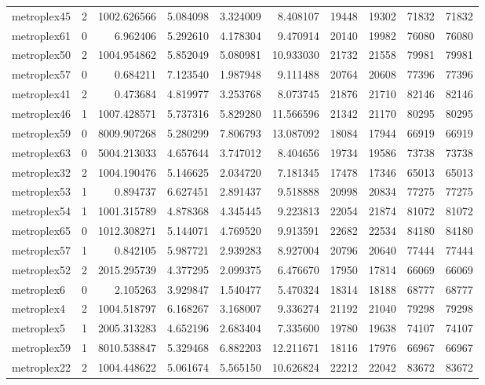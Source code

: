 \begin{longtable}{|l|r|r|r|r|r|r|r|r|r|}
metroplex45 & 2 & 1002.626566 & 5.084098 & 3.324009 & 8.408107 & 19448 & 19302 & 71832 & 71832 \\
metroplex61 & 0 & 6.962406 & 5.292610 & 4.178304 & 9.470914 & 20140 & 19982 & 76080 & 76080 \\
metroplex50 & 2 & 1004.954862 & 5.852049 & 5.080981 & 10.933030 & 21732 & 21558 & 79981 & 79981 \\
metroplex57 & 0 & 0.684211 & 7.123540 & 1.987948 & 9.111488 & 20764 & 20608 & 77396 & 77396 \\
metroplex41 & 2 & 0.473684 & 4.819977 & 3.253768 & 8.073745 & 21876 & 21710 & 82146 & 82146 \\
metroplex46 & 1 & 1007.428571 & 5.737316 & 5.829280 & 11.566596 & 21342 & 21170 & 80295 & 80295 \\
metroplex59 & 0 & 8009.907268 & 5.280299 & 7.806793 & 13.087092 & 18084 & 17944 & 66919 & 66919 \\
metroplex63 & 0 & 5004.213033 & 4.657644 & 3.747012 & 8.404656 & 19734 & 19586 & 73738 & 73738 \\
metroplex32 & 2 & 1004.190476 & 5.146625 & 2.034720 & 7.181345 & 17478 & 17346 & 65013 & 65013 \\
metroplex53 & 1 & 0.894737 & 6.627451 & 2.891437 & 9.518888 & 20998 & 20834 & 77275 & 77275 \\
metroplex54 & 1 & 1001.315789 & 4.878368 & 4.345445 & 9.223813 & 22054 & 21874 & 81072 & 81072 \\
metroplex65 & 0 & 1012.308271 & 5.144071 & 4.769520 & 9.913591 & 22682 & 22534 & 84180 & 84180 \\
metroplex57 & 1 & 0.842105 & 5.987721 & 2.939283 & 8.927004 & 20796 & 20640 & 77444 & 77444 \\
metroplex52 & 2 & 2015.295739 & 4.377295 & 2.099375 & 6.476670 & 17950 & 17814 & 66069 & 66069 \\
metroplex6 & 0 & 2.105263 & 3.929847 & 1.540477 & 5.470324 & 18314 & 18188 & 68777 & 68777 \\
metroplex4 & 2 & 1004.518797 & 6.168267 & 3.168007 & 9.336274 & 21192 & 21040 & 79298 & 79298 \\
metroplex5 & 1 & 2005.313283 & 4.652196 & 2.683404 & 7.335600 & 19780 & 19638 & 74107 & 74107 \\
metroplex59 & 1 & 8010.538847 & 5.329468 & 6.882203 & 12.211671 & 18116 & 17976 & 66967 & 66967 \\
metroplex22 & 2 & 1004.448622 & 5.061674 & 5.565150 & 10.626824 & 22212 & 22042 & 83672 & 83672 \\

\end{longtable}
